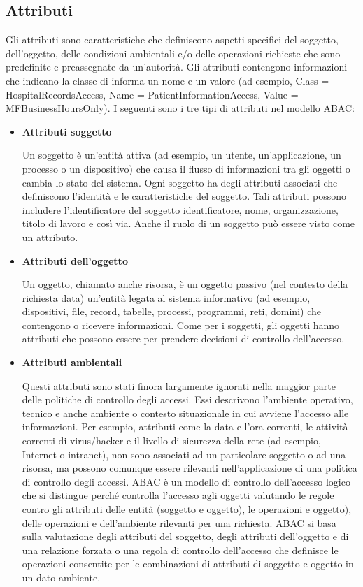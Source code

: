 \subsection{Attributi}
Gli attributi sono caratteristiche che definiscono aspetti specifici del soggetto, dell'oggetto, delle condizioni ambientali e/o delle operazioni richieste che sono predefinite e preassegnate da un'autorità. Gli attributi contengono informazioni che indicano la classe di informa un nome e un valore (ad esempio, Class = HospitalRecordsAccess, Name = PatientInformationAccess, Value = MFBusinessHoursOnly).
\singlespacing
I seguenti sono i tre tipi di attributi nel modello ABAC:
\begin{itemize}
    \item \textbf{Attributi soggetto}
    
Un soggetto è un'entità attiva (ad esempio, un utente, un'applicazione, un processo o un dispositivo) che causa il flusso di informazioni tra gli oggetti o cambia lo stato del sistema. Ogni soggetto ha degli attributi associati che definiscono l'identità e le caratteristiche del soggetto. Tali attributi possono includere l'identificatore del soggetto identificatore, nome, organizzazione, titolo di lavoro e così via. Anche il ruolo di un soggetto può essere visto come un attributo.

    \item \textbf{Attributi dell'oggetto}
    
Un oggetto, chiamato anche risorsa, è un oggetto passivo (nel contesto della richiesta data) un'entità legata al sistema informativo (ad esempio, dispositivi, file, record, tabelle, processi, programmi, reti, domini) che contengono o ricevere informazioni. Come per i soggetti, gli oggetti hanno attributi che possono essere per prendere decisioni di controllo dell'accesso.

    \item \textbf{Attributi ambientali}
    
Questi attributi sono stati finora largamente ignorati nella maggior parte delle politiche di controllo degli accessi. Essi descrivono l'ambiente operativo, tecnico e anche ambiente o contesto situazionale in cui avviene l'accesso alle informazioni. Per esempio, attributi come la data e l'ora correnti, le attività correnti di virus/hacker e il livello di sicurezza della rete (ad esempio, Internet o intranet), non sono associati ad un particolare soggetto o ad una risorsa, ma possono comunque essere rilevanti nell'applicazione di una politica di controllo degli accessi. ABAC è un modello di controllo dell'accesso logico che si distingue perché controlla l'accesso agli oggetti valutando le regole contro gli attributi delle entità (soggetto e oggetto), le operazioni e oggetto), delle operazioni e dell'ambiente rilevanti per una richiesta. ABAC si basa sulla valutazione degli attributi del soggetto, degli attributi dell'oggetto e di una relazione forzata o una regola di controllo dell'accesso che definisce le operazioni consentite per le combinazioni di attributi di soggetto e oggetto in un dato ambiente.
\end{itemize}

